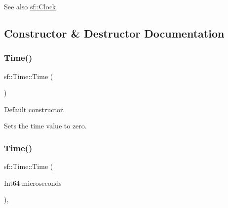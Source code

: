 \begin{DoxyCode}{0}
\DoxyCodeLine{\{}
\DoxyCodeLine{\}}
\DoxyCodeLine{}
\end{DoxyCode}


\begin{DoxySeeAlso}{See also}
\mbox{\hyperlink{classsf_1_1_clock}{sf\+::\+Clock}} \begin{DoxyVerb}\end{DoxyVerb}
 
\end{DoxySeeAlso}


\subsection{Constructor \& Destructor Documentation}
\mbox{\label{classsf_1_1_time_acba0cfbc49e3a09a22a8e079eb67a05c}} 
\subsubsection{\texorpdfstring{Time()}{Time()}\hspace{0.1cm}{\footnotesize\ttfamily [1/2]}}
{\footnotesize\ttfamily sf\+::\+Time\+::\+Time (\begin{DoxyParamCaption}{ }\end{DoxyParamCaption})}



Default constructor. 

Sets the time value to zero. \begin{DoxyVerb}\end{DoxyVerb}
 \mbox{\label{classsf_1_1_time_abb009ceaef7f7e234572128cc81ba9b0}} 
\subsubsection{\texorpdfstring{Time()}{Time()}\hspace{0.1cm}{\footnotesize\ttfamily [2/2]}}
{\footnotesize\ttfamily sf\+::\+Time\+::\+Time (\begin{DoxyParamCaption}\item[{Int64}]{microseconds }\end{DoxyParamCaption})\hspace{0.3cm}{\ttfamily [explicit]}, {\ttfamily [private]}}



